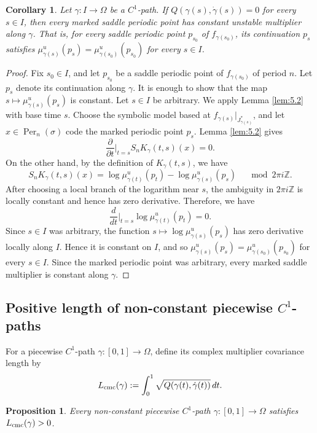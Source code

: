 \documentclass[11pt]{amsart}
\theoremstyle{plain}
\newtheorem{cor}[thm]{Corollary}
\newtheorem{prop}[thm]{Proposition}
\theoremstyle{definition}
\theoremstyle{remark}
\begin{document}
\begin{cor}\label{cor:multiplier-constant}
Let $\gamma\colon I\to\Omega$ be a $C^1$-path. If
$Q(\gamma(s),\dot\gamma(s))=0$ for every $s\in I$,
then every marked saddle periodic point has constant unstable multiplier along
$\gamma$. That is, for every saddle periodic point $p_{s_0}$ of
$f_{\gamma(s_0)}$, its continuation $p_s$ satisfies
$\mu^u_{\gamma(s)}(p_s)=\mu^u_{\gamma(s_0)}(p_{s_0})$
for every $s\in I$.
\end{cor}

\begin{proof}
Fix $s_0\in I$, and let $p_{s_0}$ be a saddle periodic point of
$f_{\gamma(s_0)}$ of period $n$. Let $p_s$ denote its continuation along $\gamma$. 
It is enough to show that the map $s\mapsto \mu^u_{\gamma(s)}(p_s)$
is constant. Let $s\in I$ be arbitrary.
We apply Lemma \ref{lem:5.2} with base time $s$. Choose the symbolic model based at $f_{\gamma(s)}|_{J^\ast_{\gamma(s)}}$,
and let $x\in \operatorname{Per}_n(\sigma)$ code the marked periodic point
$p_s$. Lemma \ref{lem:5.2} gives
$$
        \frac{\partial}{\partial t}\bigg|_{t=s}
        S_nK_\gamma(t,s)(x)=0 .
$$
On the other hand, by the definition of $K_\gamma(t,s)$, we have
$$
        S_nK_\gamma(t,s)(x)
        =
        \log \mu^u_{\gamma(t)}(p_t)
        -
        \log \mu^u_{\gamma(s)}(p_s)
        \quad \mod 2\pi i\mathbb Z .
$$
After choosing a local branch of the logarithm near $s$, the ambiguity in
$2\pi i\mathbb Z$ is locally constant and hence has zero derivative.
Therefore, we have
$$
        \frac{d}{dt}\bigg|_{t=s}
        \log \mu^u_{\gamma(t)}(p_t)=0 .
$$
Since $s\in I$ was arbitrary, the function
$s \mapsto \log \mu^u_{\gamma(s)}(p_s)$
has zero derivative locally along $I$. Hence it is constant on $I$, and so
$\mu^u_{\gamma(s)}(p_s)=\mu^u_{\gamma(s_0)}(p_{s_0})
$
for every $s\in I$. Since the marked periodic point was arbitrary, every
marked saddle multiplier is constant along $\gamma$.
\end{proof}


\subsection{Positive length of non-constant piecewise $C^1$-paths}
For a piecewise $C^1$-path $\gamma \colon [0,1]\to\Omega$, define its
complex multiplier covariance
length
by
$$
L_{\rm cmc}(\gamma) := \int_0^1
\sqrt{Q(\gamma(t),\dot\gamma(t))}\,dt.
$$



\begin{prop}\label{prop:positive-length}
Every non-constant piecewise $C^1$-path
$\gamma\colon [0,1]\to\Omega$
satisfies
$L_{\rm cmc}(\gamma)>0$.
\end{prop}
\end{document}

